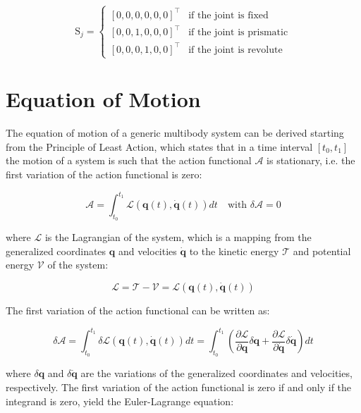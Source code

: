 \begin{equation}
    \mathrm{S} _j =
    \begin{cases}
        [0, 0, 0, 0, 0, 0] ^\top & \text{if the joint is fixed}     \\
        [0, 0, 1, 0, 0, 0] ^\top & \text{if the joint is prismatic} \\
        [0, 0, 0, 1, 0, 0] ^\top & \text{if the joint is revolute}
    \end{cases}
\end{equation}

\section{Equation of Motion}
\label{sec:back_eom}

The equation of motion of a generic multibody system can be derived starting from the Principle of Least Action, which states that in a time interval $[t _0, t _1]$ the motion of a system is such that the action functional $\mathcal{A}$ is stationary, i.e. the first variation of the action functional is zero:

\begin{equation}
    \mathcal{A} = \int _{t _0} ^{t _1} \mathcal{L} (\mathbf{q}(t), \mathbf{\dot{q}}(t)) dt \quad \text{with } \delta \mathcal{A} = 0
\end{equation}

where $\mathcal{L}$ is the Lagrangian of the system, which is a mapping from the generalized coordinates $\mathbf{q}$ and velocities $\mathbf{\dot{q}}$ to the kinetic energy $\mathcal{T}$ and potential energy $\mathcal{V}$ of the system:

\begin{equation}
    \mathcal{L} = \mathcal{T} - \mathcal{V} = \mathcal{L} (\mathbf{q}(t), \mathbf{\dot{q}}(t))
\end{equation}

The first variation of the action functional can be written as:

\begin{equation}
    \delta \mathcal{A} = \int _{t _0} ^{t _1} \delta \mathcal{L} (\mathbf{q}(t), \mathbf{\dot{q}}(t))dt = \int _{t _0} ^{t _1} \left( \frac{\partial \mathcal{L}}{\partial \mathbf{q}} \delta \mathbf{q} + \frac{\partial \mathcal{L}}{\partial \mathbf{\dot{q}}} \delta \mathbf{\dot{q}} \right) dt
\end{equation}

where $\delta \mathbf{q}$ and $\delta \mathbf{\dot{q}}$ are the variations of the generalized coordinates and velocities, respectively. The first variation of the action functional is zero if and only if the integrand is zero, yield the Euler-Lagrange equation:

